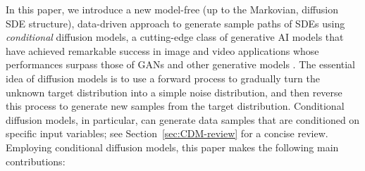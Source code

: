 \documentclass[11pt]{article}
\begin{document}
In this paper, we introduce a new model-free (up to the Markovian, diffusion SDE structure), data-driven approach to generate sample paths of SDEs using {\it conditional} diffusion models, a cutting-edge class of generative AI models that have achieved remarkable success in image and video applications whose performances surpass those of GANs and other generative models \citep{dhariwal2021diffusion, ho2020denoising, rombach2022high}.
The essential idea of diffusion models is to use a forward process to gradually turn the unknown target distribution into a simple noise distribution, and then reverse this process to generate new samples from the target distribution. 
Conditional diffusion models, in particular, can generate data samples that are conditioned on specific input variables; see Section~\ref{sec:CDM-review} for a concise review.
Employing  conditional diffusion models, this paper makes the following main contributions:
\end{document}
